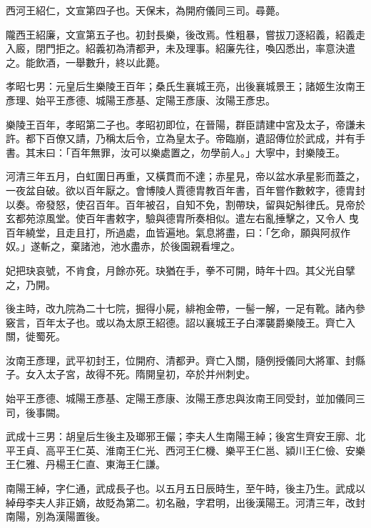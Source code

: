 \begin{pinyinscope}
 西河王紹仁，文宣第四子也。天保末，為開府儀同三司。尋薨。



 隴西王紹廉，文宣第五子也。初封長樂，後改焉。性粗暴，嘗拔刀逐紹義，紹義走入廄，閉門拒之。紹義初為清都尹，未及理事。紹廉先往，喚囚悉出，率意決遣之。能飲酒，一舉數升，終以此薨。



 孝昭七男：元皇后生樂陵王百年；桑氏生襄城王亮，出後襄城景王；諸姬生汝南王彥理、始平王彥德、城陽王彥基、定陽王彥康、汝陽王彥忠。



 樂陵王百年，孝昭第二子也。孝昭初即位，在晉陽，群臣請建中宮及太子，帝謙未許。都下百僚又請，乃稱太后令，立為皇太子。帝臨崩，遺詔傳位於武成，并有手書。其末曰：「百年無罪，汝可以樂處置之，勿學前人。」大寧中，封樂陵王。



 河清三年五月，白虹圍日再重，又橫貫而不達；赤星見，帝以盆水承星影而蓋之，一夜盆自破。欲以百年厭之。會博陵人賈德胄教百年書，百年嘗作數敕字，德胄封以奏。帝發怒，使召百年。百年被召，自知不免，割帶玦，留與妃斛律氏。見帝於玄都苑涼風堂。使百年書敕字，驗與德胄所奏相似。遣左右亂捶擊之，又令人
 曳百年繞堂，且走且打，所過處，血皆遍地。氣息將盡，曰：「乞命，願與阿叔作奴。」遂斬之，棄諸池，池水盡赤，於後園親看埋之。



 妃把玦哀號，不肯食，月餘亦死。玦猶在手，拳不可開，時年十四。其父光自擘之，乃開。



 後主時，改九院為二十七院，掘得小屍，緋袍金帶，一髻一解，一足有靴。諸內參竅言，百年太子也。或以為太原王紹德。詔以襄城王子白澤襲爵樂陵王。齊亡入關，徙蜀死。



 汝南王彥理，武平初封王，位開府、清都尹。齊亡入關，隨例授儀同大將軍、封縣子。女入太子宮，故得不死。隋開皇初，卒於并州刺史。



 始平王彥德、城陽王彥基、定陽王彥康、汝陽王彥忠與汝南王同受封，並加儀同三司，後事闕。



 武成十三男：胡皇后生後主及瑯邪王儼；李夫人生南陽王綽；後宮生齊安王廓、北平王貞、高平王仁英、淮南王仁光、西河王仁機、樂平王仁邕、潁川王仁儉、安樂王仁雅、丹楊王仁直、東海王仁謙。



 南陽王綽，字仁通，武成長子也。以五月五日辰時生，至午時，後主乃生。武成以綽母李夫人非正嫡，故貶為第二。初名融，字君明，出後漢陽王。河清三年，改封南陽，別為漢陽置後。




\end{pinyinscope}
